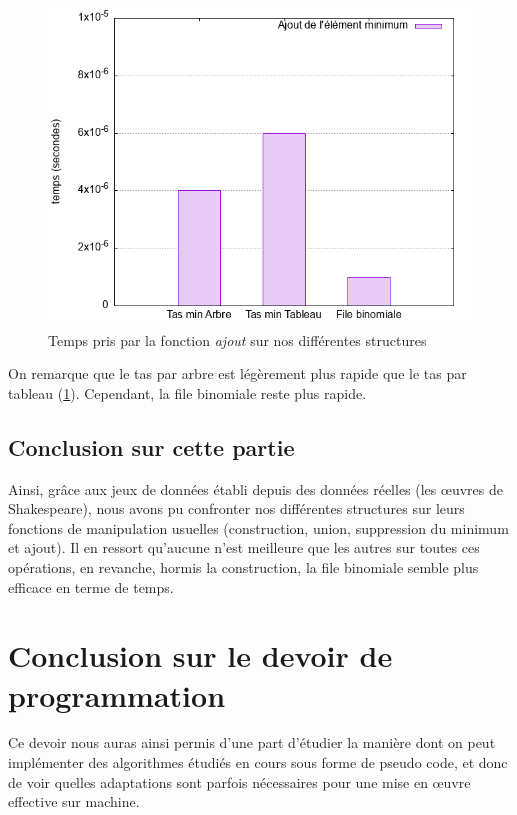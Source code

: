 \documentclass[12pt,a4paper]{article}
\begin{document}
\begin{figure}[hbtp]
\centering
\includegraphics[scale=0.5]{../Images/svg courbes pour rapport/temps_ajout_shakespeare.png}
\caption{Temps pris par la fonction \textit{ajout} sur nos différentes structures}
\label{fig12}
\end{figure}

On remarque que le tas par arbre est légèrement plus rapide que le tas par tableau (\ref{fig12}). Cependant, la file binomiale reste plus rapide.


\subsection{Conclusion sur cette partie}

Ainsi, grâce aux jeux de données établi depuis des données réelles (les œuvres de Shakespeare), nous avons pu confronter nos différentes structures sur leurs fonctions de manipulation usuelles (construction, union, suppression du minimum et ajout). Il en ressort qu'aucune n'est meilleure que les autres sur toutes ces opérations, en revanche, hormis la construction, la file binomiale semble plus efficace en terme de temps.

 \section{Conclusion sur le devoir de programmation}
Ce devoir nous auras ainsi permis d'une part d'étudier la manière dont on peut implémenter des algorithmes étudiés en cours sous forme de pseudo code, et donc de voir quelles adaptations sont parfois nécessaires pour une mise en œuvre effective sur machine.
\end{document}
